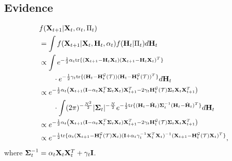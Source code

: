 \documentclass[journal]{IEEEtran}
\begin{document}
\subsection{Evidence}\label{apdx:evidence}
\begin{equation}\label{eqn:evidence_marginalization}
    \begin{aligned}
&f({\bf{X}}_{t+1}|{\bf{X}}_t,\alpha_t,{\Pi}_t)\\
&=\int f({\bf{X}}_{t+1}|{\bf{X}}_t,{\bf{H}}_t,\alpha_t) f({\bf{H}}_t|{\Pi}_t)d{\bf{H}}_t
\\&\propto\int e^{-\frac{1}{2}\alpha_t\text{tr}\{({\bf{X}}_{t+1}-{\bf{H}}_t{\bf{X}}_t)({\bf{X}}_{t+1}-{\bf{H}}_t{\bf{X}}_t)^T\}}\\
&\qquad\cdot e^{-\frac{1}{2}\gamma_t\text{tr}\{({\bf{H}}_{t}-{\bf{H}}_t^{\mathcal{G}}(\mathcal{T}))({\bf{H}}_{t}-{\bf{H}}_t^{\mathcal{G}}(\mathcal{T}))^T\}}d{\bf{H}}_t
\\&\propto e^{-\frac{1}{2}\alpha_t\left({\bf{X}}_{t+1}({\bf{I}}-\alpha_t{\bf{X}}_t^T{\boldsymbol{\Sigma}}_t{\bf{X}}_t){\bf{X}}_{t+1}^T-2\gamma_t{\bf{H}}_t^{\mathcal{G}}(\mathcal{T}){\boldsymbol{\Sigma}}_t{\bf{X}}_t{\bf{X}}_{t+1}^T\right)}
\\&\qquad\cdot\int (2\pi)^{-\frac{N^2}{2}}|{\boldsymbol{\Sigma}}_t|^{-\frac{N}{2}}e^{-\frac{1}{2}\text{tr}\{({\bf{H}}_t-\hat {\bf{H}}_t){\boldsymbol{\Sigma}}_t^{-1}({\bf{H}}_t-\hat {\bf{H}}_t)^T\}}d{\bf{H}}_t
\\&\propto e^{-\frac{1}{2}\alpha_t\left({\bf{X}}_{t+1}({\bf{I}}-\alpha_t{\bf{X}}_t^T{\boldsymbol{\Sigma}}_t{\bf{X}}_t){\bf{X}}_{t+1}^T-2\gamma_t{\bf{H}}_t^{\mathcal{G}}(\mathcal{T}){\boldsymbol{\Sigma}}_t{\bf{X}}_t{\bf{X}}_{t+1}^T\right)}
\\&\propto e^{-\frac{1}{2}\text{tr}\{\alpha_t({\bf{X}}_{t+1}-{\bf{H}}_t^{\mathcal{G}}(\mathcal{T}){\bf{X}}_t)({\bf{I}}+\alpha_t\gamma_t^{-1}{\bf{X}}_t^T{\bf{X}}_t)^{-1}({\bf{X}}_{t+1}-{\bf{H}}_t^{\mathcal{G}}(\mathcal{T}){\bf{X}}_t)^T\}},
\end{aligned}
\end{equation}
where ${\boldsymbol{\Sigma}}_t^{-1}=\alpha_t{\bf{X}}_t{\bf{X}}_t^T+\gamma_t{\bf{I}}$. 
\end{document}
